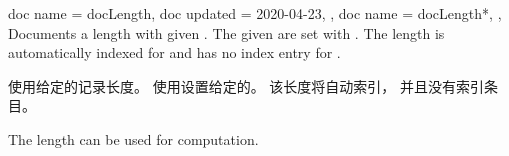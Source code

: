 \begin{docCommands}[doc parameter=\oarg{options}\marg{name}]
{
  {
    doc name    = docLength,
    doc updated = 2020-04-23,
  },
  {
    doc name = docLength*,
  },
}
Documents a length with given .
The given  are set with .
The length is automatically indexed for 
and has no index entry for .

使用给定的记录长度。 使用设置给定的。 该长度将自动索引， 并且没有索引条目。
\begin{dispExample}
The length  can be used for computation.
\end{dispExample}
\end{docCommands}